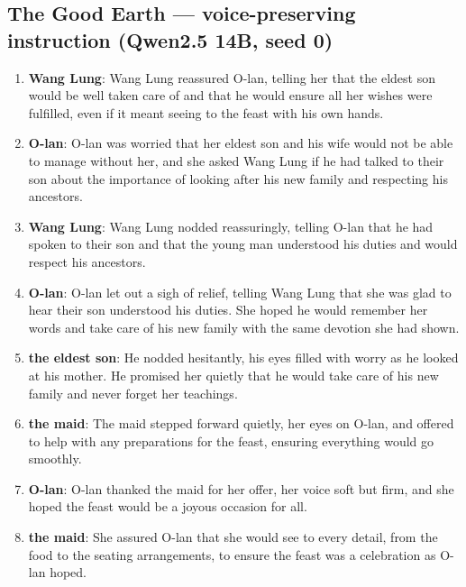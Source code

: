 \documentclass[10pt]{article}
\begin{document}
\subsection*{The Good Earth --- voice-preserving instruction (Qwen2.5 14B, seed 0)}

\begin{enumerate}\setlength{\itemsep}{1pt}\small

\item \textbf{Wang Lung}: Wang Lung reassured O-lan, telling her that the eldest son would be well taken care of and that he would ensure all her wishes were fulfilled, even if it meant seeing to the feast with his own hands.

\item \textbf{O-lan}: O-lan was worried that her eldest son and his wife would not be able to manage without her, and she asked Wang Lung if he had talked to their son about the importance of looking after his new family and respecting his ancestors.

\item \textbf{Wang Lung}: Wang Lung nodded reassuringly, telling O-lan that he had spoken to their son and that the young man understood his duties and would respect his ancestors.

\item \textbf{O-lan}: O-lan let out a sigh of relief, telling Wang Lung that she was glad to hear their son understood his duties. She hoped he would remember her words and take care of his new family with the same devotion she had shown.

\item \textbf{the eldest son}: He nodded hesitantly, his eyes filled with worry as he looked at his mother. He promised her quietly that he would take care of his new family and never forget her teachings.

\item \textbf{the maid}: The maid stepped forward quietly, her eyes on O-lan, and offered to help with any preparations for the feast, ensuring everything would go smoothly.

\item \textbf{O-lan}: O-lan thanked the maid for her offer, her voice soft but firm, and she hoped the feast would be a joyous occasion for all.

\item \textbf{the maid}: She assured O-lan that she would see to every detail, from the food to the seating arrangements, to ensure the feast was a celebration as O-lan hoped.


\end{enumerate}
\end{document}
